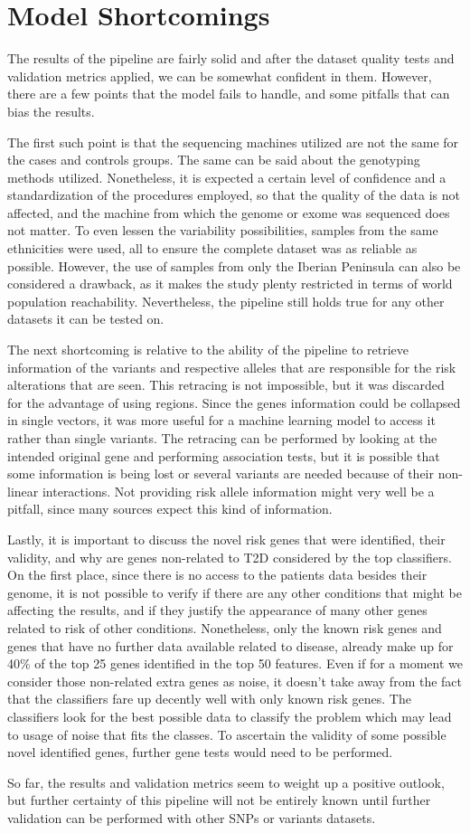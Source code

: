 \newpage

\section{Model Shortcomings}

The results of the pipeline are fairly solid and after the dataset quality tests and validation metrics applied, we can be somewhat confident in them. However, there are a few points that the model fails to handle, and some pitfalls that can bias the results. 

The first such point is that the sequencing machines utilized are not the same for the cases and controls groups. The same can be said about the genotyping methods utilized. Nonetheless, it is expected a certain level of confidence and a standardization of the procedures employed, so that the quality of the data is not affected, and the machine from which the genome or exome was sequenced does not matter. To even lessen the variability possibilities, samples from the same ethnicities were used, all to ensure the complete dataset was as reliable as possible. However, the use of samples from only the Iberian Peninsula can also be considered a drawback, as it makes the study plenty restricted in terms of world population reachability. Nevertheless, the pipeline still holds true for any other datasets it can be tested on.

The next shortcoming is relative to the ability of the pipeline to retrieve information of the variants and respective alleles that are responsible for the risk alterations that are seen. This retracing is not impossible, but it was discarded for the advantage of using regions. Since the genes information could be collapsed in single vectors, it was more useful for a machine learning model to access it rather than single variants. The retracing can be performed by looking at the intended original gene and performing association tests, but it is possible that some information is being lost or several variants are needed because of their non-linear interactions. Not providing risk allele information might very well be a pitfall, since many sources expect this kind of information.

Lastly, it is important to discuss the novel risk genes that were identified, their validity, and why are genes non-related to \gls{T2D} considered by the top classifiers. On the first place, since there is no access to the patients data besides their genome, it is not possible to verify if there are any other conditions that might be affecting the results, and if they justify the appearance of many other genes related to risk of other conditions. Nonetheless, only the known risk genes and genes that have no further data available related to disease, already make up for 40\% of the top 25 genes identified in the top 50 features. Even if for a moment we consider those non-related extra genes as noise, it doesn't take away from the fact that the classifiers fare up decently well with only known risk genes. The classifiers look for the best possible data to classify the problem which may lead to usage of noise that fits the classes. To ascertain the validity of some possible novel identified genes, further gene tests would need to be performed.

So far, the results and validation metrics seem to weight up a positive outlook, but further certainty of this pipeline will not be entirely known until further validation can be performed with other \gls{SNP}s or variants datasets.